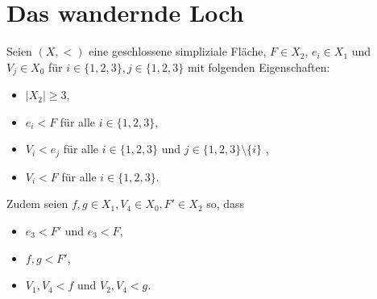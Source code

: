 \documentclass[12pt,titlepage]{article}
\begin{document}
\section*{Das wandernde Loch}
 Seien $(X,<)$ eine geschlossene simpliziale Fläche, $F \in X_{2}$, $e_{i} \in X_{1}$ und $V_{j} \in X_{0}$ für $i \in \{1,2,3\},j \in \{1,2,3\}$ mit folgenden Eigenschaften:
 \begin{itemize}
 \item $\vert X_{2}\vert \geq 3$,
 \item $e_{i} < F$ für alle $i \in \{1,2,3\}$,
 \item $V_{i}<e_{j}$ für alle $i \in \{1,2,3\}$ und $j \in \{1,2,3\} \setminus\{i\}$ ,
 \item $V_{i} < F$ für alle $i \in \{1,2,3\}$.
\end{itemize}  
Zudem seien $f,g \in X_1,V_4 \in X_0,F' \in X_2$ so, dass
\begin{itemize}
\item $e_3<F'$ und $e_3<F$,
\item $f,g <F'$, 
\item $V_1,V_4<f$ und $V_2,V_4<g$.
\end{itemize}
\end{document}
